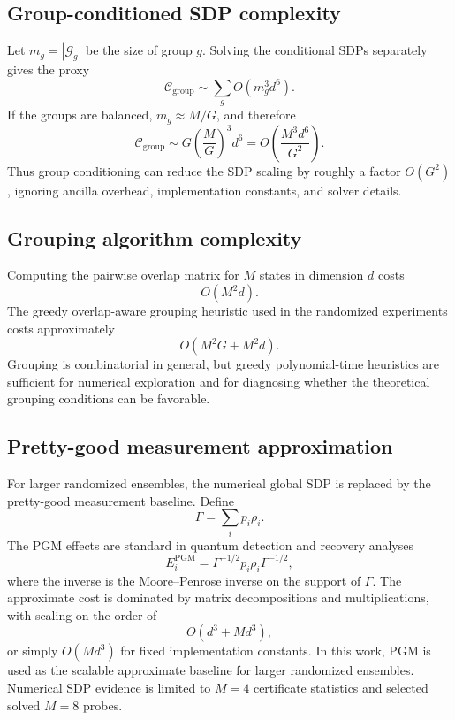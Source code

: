 \documentclass[
 reprint,
 amsmath,amssymb,
 aps,
 pra,
 floatfix,
]{revtex4-2}
\begin{document}
\subsection{Group-conditioned SDP complexity}

Let $m_g=|\mathcal G_g|$ be the size of group $g$. Solving the conditional SDPs separately gives the proxy
\begin{equation}
    \mathcal C_{\mathrm{group}}
    \sim
    \sum_g O(m_g^3d^6).
\end{equation}
If the groups are balanced, $m_g\approx M/G$, and therefore
\begin{equation}
    \mathcal C_{\mathrm{group}}
    \sim
    G\left(\frac{M}{G}\right)^3d^6
    =
    O\left(\frac{M^3d^6}{G^2}\right).
\end{equation}
Thus group conditioning can reduce the SDP scaling by roughly a factor $O(G^2)$, ignoring ancilla overhead, implementation constants, and solver details.

\subsection{Grouping algorithm complexity}

Computing the pairwise overlap matrix for $M$ states in dimension $d$ costs
\begin{equation}
    O(M^2d).
\end{equation}
The greedy overlap-aware grouping heuristic used in the randomized experiments costs approximately
\begin{equation}
    O(M^2G+M^2d).
\end{equation}
Grouping is combinatorial in general, but greedy polynomial-time heuristics are sufficient for numerical exploration and for diagnosing whether the theoretical grouping conditions can be favorable.

\subsection{Pretty-good measurement approximation}

For larger randomized ensembles, the numerical global SDP is replaced by the pretty-good measurement baseline. Define
\begin{equation}
    \Gamma=\sum_ip_i\rho_i.
\end{equation}
The PGM effects are standard in quantum detection and recovery analyses~\cite{hausladen1994pretty,eldar2001quantum,barnum2002reversing}
\begin{equation}
    E_i^{\mathrm{PGM}}
    =
    \Gamma^{-1/2}p_i\rho_i\Gamma^{-1/2},
\end{equation}
where the inverse is the Moore--Penrose inverse on the support of \(\Gamma\).
The approximate cost is dominated by matrix decompositions and multiplications, with scaling on the order of
\begin{equation}
    O(d^3+Md^3),
\end{equation}
or simply $O(Md^3)$ for fixed implementation constants. In this work, PGM is used as the scalable approximate baseline for larger randomized ensembles. Numerical SDP evidence is limited to \(M=4\) certificate statistics and selected solved \(M=8\) probes.
\end{document}
